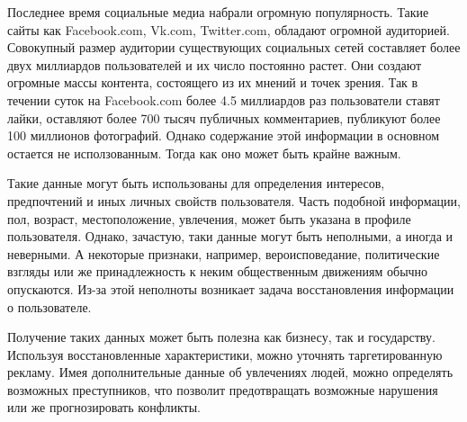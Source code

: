 \documentclass[annotation,times,page4]{itmo-student-thesis}
\begin{document}

\makemastertitle

\tableofcontents

\startprefacepage

Последнее время социальные медиа набрали огромную популярность. Такие сайты как Facebook.com, Vk.com, Twitter.com, обладают огромной аудиторией. Совокупный размер аудитории существующих социальных сетей составляет более двух миллиардов пользователей и их число постоянно растет. Они создают огромные массы контента, состоящего из их мнений и точек зрения. Так в течении суток на Facebook.com более 4.5 миллиардов раз пользователи ставят лайки, оставляют более 700 тысяч публичных комментариев, публикуют более 100 миллионов фотографий. Однако содержание этой информации в основном остается не исползованным. Тогда как оно может быть крайне важным.

Такие данные могут быть использованы для определения интересов, предпочтений и иных личных свойств пользователя. Часть подобной информации, пол, возраст,  местоположение, увлечения, может быть указана в профиле пользователя. Однако, зачастую, таки данные могут быть неполными, а иногда и неверными. А некоторые признаки, например, вероисповедание, политические взгляды или же принадлежность к неким общественным движениям обычно опускаются. Из-за этой неполноты возникает задача восстановления информации о пользователе.

Получение таких данных может быть полезна как бизнесу, так и государству. Используя восстановленные характеристики, можно уточнять таргетированную рекламу. Имея дополнительные данные об увлечениях людей, можно определять возможных преступников, что позволит предотвращать возможные нарушения или же прогнозировать конфликты.
\end{document}
